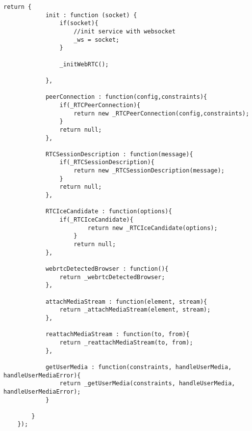 \begin{appendices}
\begin{lstlisting}[caption={WebRTCService in application client},label={code:webrtc_service}]
		return {
			init : function (socket) {
				if(socket){
					//init service with websocket
					_ws = socket;
				}

				_initWebRTC();

			},

			peerConnection : function(config,constraints){
				if(_RTCPeerConnection){
					return new _RTCPeerConnection(config,constraints);
				}
				return null;
			},

			RTCSessionDescription : function(message){
				if(_RTCSessionDescription){
					return new _RTCSessionDescription(message);
				}
				return null;
			},

			RTCIceCandidate : function(options){
				if(_RTCIceCandidate){
						return new _RTCIceCandidate(options);
					}
					return null;
			},

			webrtcDetectedBrowser : function(){
				return _webrtcDetectedBrowser;
			},

			attachMediaStream : function(element, stream){
				return _attachMediaStream(element, stream);
			},

			reattachMediaStream : function(to, from){
				return _reattachMediaStream(to, from);
			},

			getUserMedia : function(constraints, handleUserMedia, handleUserMediaError){
				return _getUserMedia(constraints, handleUserMedia, handleUserMediaError);
			}

		}
	});	
	
\end{lstlisting}

\end{appendices}